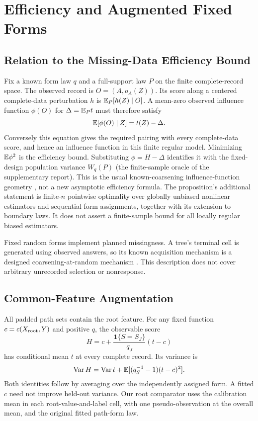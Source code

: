 \section{Efficiency and Augmented Fixed Forms}\label{app:augmentation}
\subsection{Relation to the Missing-Data Efficiency Bound}
Fix a known form law $q$ and a full-support law $P$ on the finite complete-record space. The observed record is $O=(A,o_A(Z))$. Its score along a centered complete-data perturbation $h$ is $\mathbb{E}_P[h(Z)\mid O]$. A mean-zero observed influence function $\phi(O)$ for $\Delta=\mathbb{E}_Pt$ must therefore satisfy
\[
 \mathbb{E}[\phi(O)\mid Z]=t(Z)-\Delta.
\]
Conversely this equation gives the required pairing with every complete-data score, and hence an influence function in this finite regular model. Minimizing $\mathbb{E}\phi^2$ is the efficiency bound. Substituting $\phi=H-\Delta$ identifies it with the fixed-design population variance $W_q(P)$ (the finite-sample oracle of the supplementary report). This is the usual known-coarsening influence-function geometry \citep{robins1994,tsiatis2006}, not a new asymptotic efficiency formula. The proposition's additional statement is finite-$n$ pointwise optimality over globally unbiased nonlinear estimators and sequential form assignments, together with its extension to boundary laws. It does not assert a finite-sample bound for all locally regular biased estimators.

Fixed random forms implement planned missingness. A tree's terminal cell is generated using observed answers, so its known acquisition mechanism is a designed coarsening-at-random mechanism \citep{heitjan1991,gill1997}. This description does not cover arbitrary unrecorded selection or nonresponse.

\subsection{Common-Feature Augmentation}
All padded path sets contain the root feature. For any fixed function $c=c(X_{\rm root},Y)$ and positive $q$, the observable score
\[
 H=c+\frac{\mathbf1\{S=S_J\}}{q_J}(t-c)
\]
has conditional mean $t$ at every complete record. Its variance is
\[
 \operatorname{Var} H=\operatorname{Var} t+\mathbb{E}[(q_{S}^{-1}-1)(t-c)^2].
\]
Both identities follow by averaging over the independently assigned form. A fitted $c$ need not improve held-out variance. Our root comparator uses the calibration mean in each root-value-and-label cell, with one pseudo-observation at the overall mean, and the original fitted path-form law.

